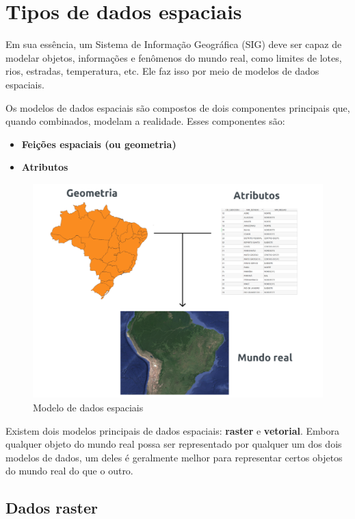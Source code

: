 \documentclass[
  portuguese,
]{krantz}
\providecommand{\tightlist}{%
  \setlength{\itemsep}{0pt}\setlength{\parskip}{0pt}}
\begin{document}
\hypertarget{tipos-de-dados-espaciais}{%
\section{Tipos de dados espaciais}\label{tipos-de-dados-espaciais}}

Em sua essência, um Sistema de Informação Geográfica (SIG) deve ser capaz de modelar objetos, informações e fenômenos do mundo real, como limites de lotes, rios, estradas, temperatura, etc. Ele faz isso por meio de modelos de dados espaciais.

Os modelos de dados espaciais são compostos de dois componentes principais que, quando combinados, modelam a realidade. Esses componentes são:

\begin{itemize}
\tightlist
\item
  \textbf{Feições espaciais (ou geometria)}
\item
  \textbf{Atributos}
\end{itemize}

\begin{figure}
\centering
\includegraphics{media/modulo0/spatial-model.png}
\caption{Modelo de dados espaciais}
\end{figure}

Existem dois modelos principais de dados espaciais: \textbf{raster} e \textbf{vetorial}. Embora qualquer objeto do mundo real possa ser representado por qualquer um dos dois modelos de dados, um deles é geralmente melhor para representar certos objetos do mundo real do que o outro.

\hypertarget{dados-raster}{%
\subsection{Dados raster}\label{dados-raster}}
\end{document}
